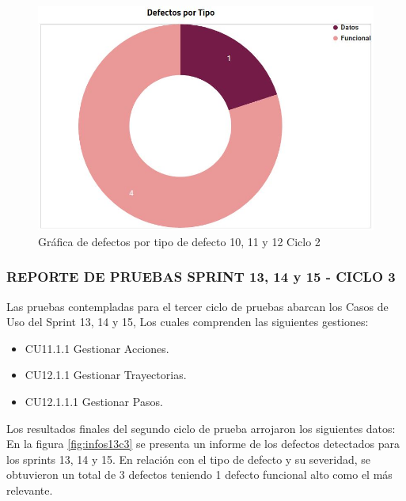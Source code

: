 \begin{figure}[H]
	\begin{center}
		\includegraphics[width=.75\textwidth]{images/pruebas/s10c2-2}
		\caption{Gráfica de defectos por tipo de defecto 10, 11 y 12  Ciclo 2}
		\label{fig:infos10c2-2}
	\end{center}
\end{figure}

\subsubsection{REPORTE DE PRUEBAS SPRINT 13, 14 y 15 - CICLO 3}

Las pruebas contempladas para el tercer ciclo de pruebas abarcan los Casos de Uso del Sprint 13, 14 y 15, Los cuales comprenden las siguientes gestiones:

\begin{itemize}
	\item CU11.1.1 Gestionar Acciones.
	\item CU12.1.1 Gestionar Trayectorias.
	\item CU12.1.1.1 Gestionar Pasos.
\end{itemize}

Los resultados finales del segundo ciclo de prueba arrojaron los siguientes datos:\\

En la figura \ref{fig:infos13c3} se presenta un informe de los defectos detectados para los sprints 13, 14 y 15. En relación con el tipo de defecto y su severidad, se obtuvieron un total de 3 defectos teniendo 1 defecto funcional alto como el más relevante.

